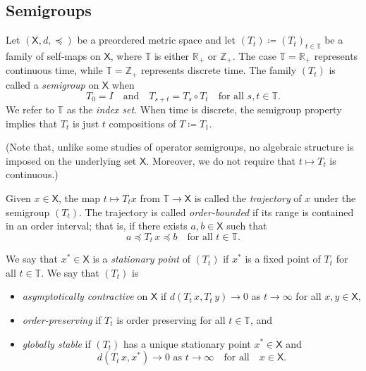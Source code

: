 \documentclass[12pt,reqno]{amsart}
\numberwithin{equation}{section}
\theoremstyle{definition}
\newcommand{\1}{\mathbbm{1}}
\newcommand{\RR}{\mathbb{R}}
\newcommand{\ZZ}{\mathbb{Z}}
\newcommand{\TT}{\mathbb T}
\newcommand{\Xsf}{\mathsf{X}}
\newcommand{\navy}[1]{\textit{\textcolor{blue!40!black}{#1}}}
\begin{document}
\subsection{Semigroups} Let $(\Xsf, d, \preceq)$ be a preordered metric
space and let $(T_t) \coloneq (T_t)_{t \in \TT}$ be a family of self-maps on $\Xsf$, where
$\TT$ is either $\RR_+$ or $\ZZ_+$.  The case $\TT = \RR_+$ represents
continuous time, while $\TT = \ZZ_+$ represents discrete time. The family
$(T_t)$ is called a \navy{semigroup} on $\Xsf$ when
%
\begin{equation*}
    T_0 = I
    \quad \text{and} \quad
    T_{s + t} = T_s \circ T_t
    \quad \text{for all } s, t \in \TT.
\end{equation*}
%
We refer to $\TT$ as the \navy{index set}.
When time is discrete, the semigroup property implies that $T_t$ is just 
$t$ compositions of $T \coloneq T_1$. 

(Note that, unlike some studies of operator
semigroups, no algebraic structure is imposed on the underlying set $\Xsf$.
Moreover, we do not require that $t \mapsto T_t$ is continuous.)

Given $x \in \Xsf$, the map $t \mapsto T_t x$ from $\TT \to \Xsf$
is called the \navy{trajectory} of $x$ under the semigroup $(T_t)$.
The trajectory is called \navy{order-bounded} if its range is contained in an
order interval; that is, if there exists $a, b \in \Xsf$ such that
%
\begin{equation}\label{eq:bt}
    a \preceq T_t \, x \preceq b \quad \text{for all $t \in \TT$}.
\end{equation}
%

We say that $x^* \in \Xsf$ is a \navy{stationary point} of $(T_t)$ if $x^*$ is a
fixed point of $T_t$ for all $t \in \TT$. We say that $(T_t)$ is
%
\begin{itemize}
    \item \navy{asymptotically contractive} on $\Xsf$ if $d(T_t \, x, T_t \, y)
        \to 0$ as $t \to \infty$ for all $x, y \in \Xsf$,
    \item \navy{order-preserving} if $T_t$ is order preserving for all $t \in
        \TT$, and
    \item \navy{globally stable} if $(T_t)$ has a unique stationary point $x^*
        \in \Xsf$
        and
        \begin{equation*}
            d(T_t \, x , x^*) \to 0
            \text{ as } t \to \infty
            \quad \text{for all} \quad
            x \in \Xsf.
        \end{equation*}
\end{itemize}
\end{document}
